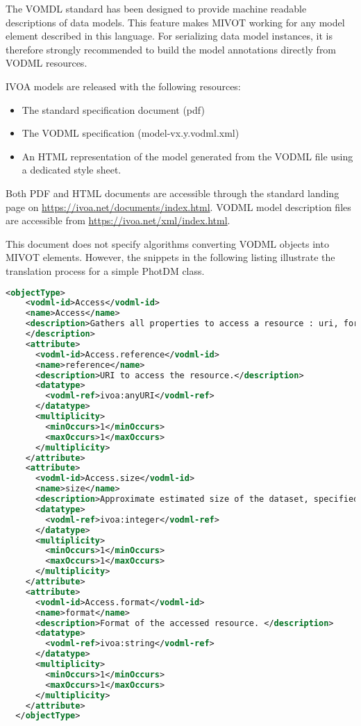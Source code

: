 The VOMDL standard has been designed to provide machine readable descriptions of data models. 
This feature makes MIVOT working for any model element described in this language. 
For serializing data model instances, it is therefore strongly recommended to build 
the model annotations directly from VODML resources.

IVOA models are released with the following resources:
\begin{itemize}
    \item The standard specification document (pdf)
    \item The VODML specification (model-vx.y.vodml.xml)
    \item An HTML representation of the model generated from the VODML file using a dedicated style sheet.    
\end{itemize}

Both PDF and HTML documents are accessible through the standard landing page
on \url{https://ivoa.net/documents/index.html}.
VODML model description files are accessible from \url{https://ivoa.net/xml/index.html}.

This document does not specify algorithms converting VODML objects 
into MIVOT elements. However, the snippets in the following listing illustrate the translation process for a simple PhotDM class.

\begin{lstlisting}[caption={VODML representation of the PhotDM class \texttt{Access}.
This is an object type with 3 attributes, each one with a cardinality equal  to 1. 
At this stage, we do not know whether attributes are typed complex or primitive type. 
This will be completed later on by going through their own VODML definitions.},language=XML]
  <objectType>
    <vodml-id>Access</vodml-id>
    <name>Access</name>
    <description>Gathers all properties to access a resource : uri, format and size . 
    </description>
    <attribute>
      <vodml-id>Access.reference</vodml-id>
      <name>reference</name>
      <description>URI to access the resource.</description>
      <datatype>
        <vodml-ref>ivoa:anyURI</vodml-ref>
      </datatype>
      <multiplicity>
        <minOccurs>1</minOccurs>
        <maxOccurs>1</maxOccurs>
      </multiplicity>
    </attribute>
    <attribute>
      <vodml-id>Access.size</vodml-id>
      <name>size</name>
      <description>Approximate estimated size of the dataset, specified in kilobytes.</description>
      <datatype>
        <vodml-ref>ivoa:integer</vodml-ref>
      </datatype>
      <multiplicity>
        <minOccurs>1</minOccurs>
        <maxOccurs>1</maxOccurs>
      </multiplicity>
    </attribute>
    <attribute>
      <vodml-id>Access.format</vodml-id>
      <name>format</name>
      <description>Format of the accessed resource. </description>
      <datatype>
        <vodml-ref>ivoa:string</vodml-ref>
      </datatype>
      <multiplicity>
        <minOccurs>1</minOccurs>
        <maxOccurs>1</maxOccurs>
      </multiplicity>
    </attribute>
  </objectType>
\end{lstlisting}  

